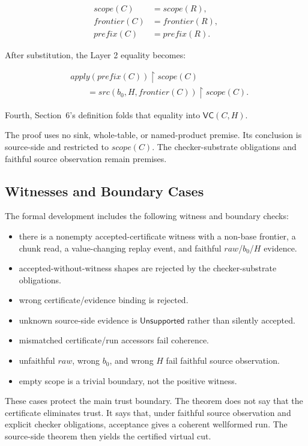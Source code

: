 \documentclass[letterpaper,10pt,twocolumn]{article}
\newcommand{\restrict}{\mathbin{\upharpoonright}}
\newcommand{\Apply}{\mathit{apply}}
\newcommand{\Src}{\mathit{src}}
\newcommand{\Scope}{\mathit{scope}}
\newcommand{\Frontier}{\mathit{frontier}}
\newcommand{\CleanPrefix}{\mathit{prefix}}
\newcommand{\RawObs}{\mathit{raw}}
\newcommand{\VC}{\mathsf{VC}}
\newcommand{\Unsupported}{\mathsf{Unsupported}}
\providecommand{\tightlist}{\setlength{\itemsep}{0pt}\setlength{\parskip}{0pt}}
\begin{document}
\[
\begin{aligned}
\Scope(C)&=\Scope(R),\\
\Frontier(C)&=\Frontier(R),\\
\CleanPrefix(C)&=\CleanPrefix(R).
\end{aligned}
\]

After substitution, the Layer 2 equality becomes:

\[
\begin{aligned}
&\Apply(\CleanPrefix(C)) \restrict \Scope(C)\\
&\qquad= \Src(b_0,H,\Frontier(C)) \restrict \Scope(C).
\end{aligned}
\]

Fourth, Section~6's definition folds that equality into
$\VC(C,H)$.

The proof uses no sink, whole-table, or named-product premise. Its
conclusion is source-side and restricted to $\Scope(C)$. The
checker-substrate obligations and faithful source observation remain
premises.

\subsection{Witnesses and Boundary
Cases}\label{non-vacuity-and-boundary-cases}

The formal development includes the following witness and boundary
checks:

\begin{itemize}\tightlist
\item there is a nonempty accepted-certificate witness with a
  non-base frontier, a chunk read, a value-changing replay event, and
  faithful $\RawObs$/$b_0$/$H$ evidence.
\item accepted-without-witness shapes are rejected by the
  checker-substrate obligations.
\item wrong certificate/evidence binding is rejected.
\item unknown source-side evidence is $\Unsupported$ rather than
  silently accepted.
\item mismatched certificate/run accessors fail coherence.
\item unfaithful $\RawObs$, wrong $b_0$, and wrong $H$ fail faithful
  source observation.
\item empty scope is a trivial boundary, not the positive witness.
\end{itemize}

These cases protect the main trust boundary. The theorem does not say
that the certificate eliminates trust. It says that, under faithful
source observation and explicit checker obligations, acceptance gives a
coherent wellformed run. The source-side theorem then
yields the certified virtual cut.
\end{document}

